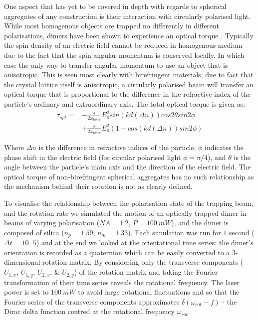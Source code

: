 One aspect that has yet to be covered in depth with regards to
spherical aggregates of any construction is their interaction with
circularly polarised light. While most homogenous objects are trapped
no differently in different polarisations, dimers have been shown to
experience an optical torque \cite{Vigilante2020, Ahn2018, Reimann2018}. 
Typically the spin density of an electric field cannot be reduced in 
homogenous medium due to the fact that the spin angular momentum is 
conserved locally. In which case the only way to transfer angular 
momentum to use an object that is anisotropic. This is seen most 
clearly with birefringent materials, due to fact that the crystal 
lattice itself is anisotropic, a circularly polarised beam will 
transfer an optical torque that is proportional to the difference in 
the refractive index of the particle's ordinary and extraordinary axis. 
The total optical torque is given as:
\begin{equation}
	\label{eq:opt_torque}
	\begin{aligned}
		\tau_{opt} =& -\frac{\epsilon}{2\omega_{laser}}E_0^2sin(kd(\Delta n))cos2\theta sin2\phi \\ &+  \frac{\epsilon}{2\omega_{laser}}E_0^2 (1-cos(kd(\Delta n))sin2\phi)
	\end{aligned}
\end{equation}

Where $\Delta n$ is the difference in refractive indices of the 
particle, $\phi$ indicates the phase shift in the electric field
(for circular polarised light $\phi= \pi/4$), and $\theta$ is the angle
between the particle's main axis and the direction of the electric field.
The optical torque of non-birefringent spherical aggregates has no such 
relationship as the mechanism behind their rotation is not as clearly defined. 

To visualise the relationship between the polarisation state of the 
trapping beam, and the rotation rate we simulated the motion of an 
optically trapped dimer in beams of varying polarisation ($NA=1.2$, 
$P=100\ mW$), and the dimer is composed of silica ($n_p=1.59$, 
$n_m=1.33$). Each simulation was run for $1$ second ($\Delta t 
=10^-5$) and at the end we looked at the orientational time series; 
the dimer's orientation is recorded as a quaternion which can be easily 
converted to a 3-dimensional rotation matrix. By considering only the 
transverse components ($U_{1,x}$, $U_{1,y}$, $U_{2,x}$, \& $U_{2,y}$) 
of the rotation matrix and taking the Fourier transformation of their 
time series reveals the rotational frequency. The laser power is set to 
$100\ mW$ to avoid large rotational fluctuations and so that the Fourier 
series of the transverse components approximates $\delta(\omega_{rot}-f)$ 
- the Dirac delta function centred at the rotational frequency $\omega_{rot}$.

